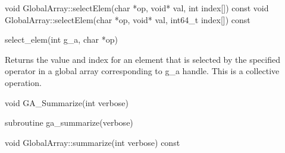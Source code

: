 \documentclass[12pt]{article}
\begin{document}
\begin{cxxapi}
\begin{cxxcode}
void GlobalArray::selectElem(char *op, void* val, int index[]) const
void GlobalArray::selectElem(char *op, void* val, int64_t index[]) const
\end{cxxcode}
\begin{funcargs}
\end{funcargs}
\end{cxxapi}


\begin{pyapi}
\begin{pycode}
select_elem(int g_a, char *op)  
\end{pycode}
\end{pyapi} 


\begin{desc}

Returns the value and index for an element that is selected by the 
specified operator in a global array corresponding to g_a handle.
This is a collective operation.
\end{desc}


\begin{capi}
\begin{ccode}
void GA_Summarize(int verbose)
\end{ccode}
\begin{funcargs}
\end{funcargs}
\end{capi}

\begin{fapi}
\begin{fcode}
subroutine ga_summarize(verbose)
\end{fcode}
\begin{funcargs}
\end{funcargs}
\end{fapi}

\begin{cxxapi}
\begin{cxxcode}
void GlobalArray::summarize(int verbose) const
\end{cxxcode}
\begin{funcargs}
\end{funcargs}
\end{cxxapi}
\end{document}
